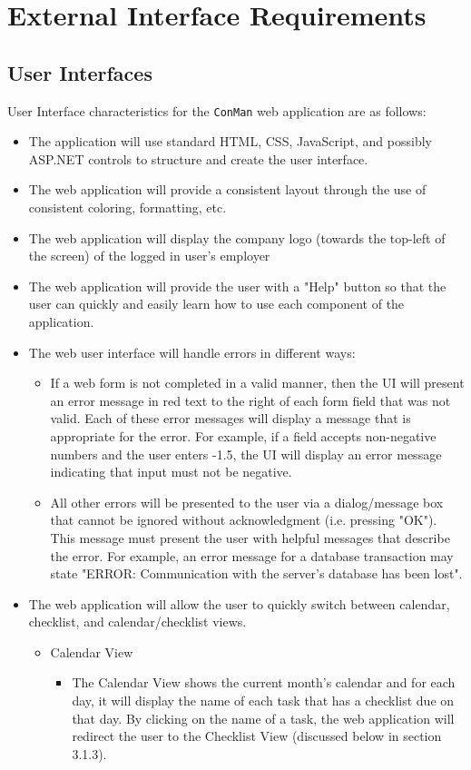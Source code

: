 \documentclass{article}
\begin{document}
\newpage
\section{External Interface Requirements}
\subsection{User Interfaces}
User Interface characteristics for the \texttt{ConMan} web application are as follows:

\begin{itemize}
    \item The application will use standard HTML, CSS, JavaScript, and possibly ASP.NET controls to structure and create the user interface.
    \item The web application will provide a consistent layout through the use of consistent coloring, formatting, etc.
    \item The web application will display the company logo (towards the top-left of the screen) of the logged in user's employer
    \item The web application will provide the user with a "Help" button so that the user can quickly and easily learn how to use each component of the application.
    \item The web user interface will handle errors in different ways:
	\begin{itemize}
		\item If a web form is not completed in a valid manner, then the UI will present an error message in red text to the right of each form field that was not valid. 
			Each of these error messages will display a message that is appropriate for the error. 
			For example, if a field accepts non-negative numbers and the user enters -1.5, the UI will display an error message indicating that input must not be negative.
		\item All other errors will be presented to the user via a dialog/message box that cannot be ignored without acknowledgment (i.e. pressing "OK"). 
			This message must present the user with helpful messages that describe the error. 
			For example, an error message for a database transaction may state "ERROR: Communication with the server's database has been lost".
	\end{itemize}
    \item The web application will allow the user to quickly switch between calendar, checklist, and calendar/checklist views.
	\begin{itemize}
		\item Calendar View
		\begin{itemize}
			\item The Calendar View shows the current month's calendar and for each day, it will display the name of each task that has a checklist due on that day. 
					By clicking on the name of a task, the web application will redirect the user to the Checklist View (discussed below in section 3.1.3).
		\end{itemize}
		

\end{itemize}
\end{itemize}
\end{document}
